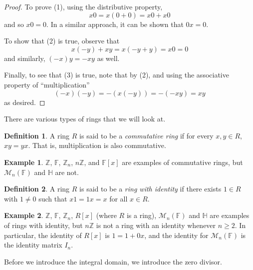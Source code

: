 \documentclass[11pt]{amsart}
\theoremstyle{definition}\newtheorem{definition}{Definition}
\theoremstyle{definition}\newtheorem{example}{Example}
\theoremstyle{theorem}\newtheorem{theorem}{Theorem}
\theoremstyle{theorem}\newtheorem{corollary}{Corollary}
\theoremstyle{theorem}\newtheorem{proposition}{Proposition}
\theoremstyle{theorem}\newtheorem{lemma}{Lemma}
\theoremstyle{theorem}\newtheorem{question}{Question}
\theoremstyle{remark}\newtheorem{remark}{Remark}
\newcommand{\Z}{\mathbb{Z}}
\newcommand{\F}{\mathbb{F}}
\newcommand{\M}{\mathcal{M}}
\renewcommand{\H}{\mathbb{H}}
\begin{document}
\begin{proof}
    To prove (1), using the distributive property,
    \begin{equation*}
        x0 = x(0 + 0) = x0 + x0
    \end{equation*}
    and so $x0 = 0$. In a similar approach, it can be shown that $0x = 0$.

    To show that (2) is true, observe that
    \begin{equation*}
        x(-y) + xy = x(-y + y) = x0 = 0
    \end{equation*}
    and similarly, $(-x)y = -xy$ as well.

    Finally, to see that (3) is true, note that by (2), and using the associative property of ``multiplication''
    \begin{equation*}
        (-x)(-y) = -(x(-y)) = -(-xy) = xy
    \end{equation*}
    as desired.
\end{proof}

There are various types of rings that we will look at.

\begin{definition}\label{definition:2}
    A ring $R$ is said to be a \emph{commutative ring} if for every $x, y \in R$, $xy = yx$. That is, multiplication is also commutative.
\end{definition}

\begin{example}\label{example:2}
    $\Z$, $\F$, $\Z_n$, $n\Z$, and $\F[x]$ are examples of commutative rings, but $\M_n(\F)$ and $\H$ are not.
\end{example}

\begin{definition}\label{definition:3}
    A ring $R$ is said to be a \emph{ring with identity} if there exists $1 \in R$ with $1 \neq 0$ such that $x1 = 1x = x$ for all $x \in R$.
\end{definition}

\begin{example}\label{example:3}
    $\Z$, $\F$, $\Z_n$, $R[x]$ (where $R$ is a ring), $\M_n(\F)$ and $\H$ are examples of rings with identity, but $n\Z$ is not a ring with an identity whenever $n \geq 2$. In particular, the identity of $R[x]$ is $1 = 1 + 0x$, and the identity for $\M_n(\F)$ is the identity matrix $I_n$.
\end{example}

Before we introduce the integral domain, we introduce the zero divisor.
\end{document}
